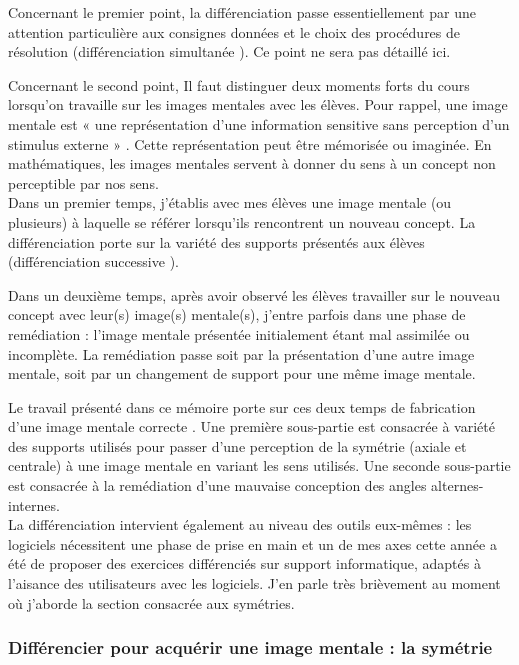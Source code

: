 Concernant le premier point, la différenciation passe essentiellement par une attention particulière aux consignes données et le choix des procédures de résolution (différenciation simultanée \cite{Eduscol}). Ce point ne sera pas détaillé ici.

Concernant le second point, Il faut distinguer deux moments forts du cours lorsqu'on travaille sur les images mentales avec les élèves. Pour rappel, une image mentale est « une représentation d'une information sensitive sans perception d'un stimulus externe » \cite{mimagery}. Cette représentation peut être mémorisée ou imaginée. En mathématiques, les images mentales servent à donner du sens à un concept non perceptible par nos sens.\\

Dans un premier temps, j'établis avec mes élèves une image mentale (ou plusieurs) à laquelle se référer lorsqu'ils rencontrent un nouveau concept. La différenciation porte sur la variété des supports présentés aux élèves (différenciation successive \cite{Eduscol}).

Dans un deuxième temps, après avoir observé les élèves travailler sur le nouveau concept avec leur(s) image(s) mentale(s), j'entre parfois dans une phase de remédiation : l'image mentale présentée initialement étant mal assimilée ou incomplète. La remédiation passe soit par la présentation d'une autre image mentale, soit par un changement de support pour une même image mentale.

Le travail présenté dans ce mémoire porte sur ces deux temps de fabrication d'une image mentale correcte . Une première sous-partie est consacrée à variété des supports utilisés pour passer d'une perception de la symétrie (axiale et centrale) à une image mentale en variant les sens utilisés. Une seconde sous-partie est consacrée à la remédiation d'une mauvaise conception des angles alternes-internes.\\

La différenciation intervient également au niveau des outils eux-mêmes : les logiciels nécessitent une phase de prise en main et un de mes axes cette année a été de proposer des exercices différenciés sur support informatique, adaptés à l'aisance des utilisateurs avec les logiciels. J'en parle très brièvement au moment où j'aborde la section consacrée aux symétries.

\subsubsection{Différencier pour acquérir une image mentale : la symétrie}

